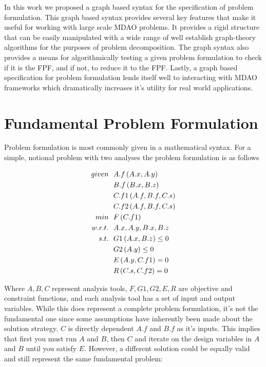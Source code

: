     In this work we proposed a graph based syntax for the specification of problem formulation. This graph based syntax provides several key
    features that make it useful for working with large scale MDAO problems. It provides a rigid structure that can be easily manipulated 
    with a wide range of well establish graph-theory algorithms for the purposes of problem decomposition. The graph syntax also 
    provides a means for algorithmically testing a given problem formulation to check if it is the FPF, and if not, to reduce it to the FPF. 
    Lastly, a graph based specification for problem formulation lends itself well to interacting with MDAO frameworks which dramatically 
    increases it's utility for real world applications. 


\section{Fundamental Problem Formulation}
    Problem formulation is most commonly given in a mathematical syntax. For a simple, notional problem with two analyses
    the problem formulation is as follows

    \begin{align}
        given & \ \ A.f\left(A.x,A.y\right) \notag
        \\ & \ \  B.f\left(B.x,B.z\right) \notag
        \\ & \ \  C.f1\left(A.f,B.f,C.s\right) \notag
        \\ & \ \  C.f2\left(A.f,B.f,C.s\right) \notag
        \\min &\ \ F\left(C.f1\right) \notag
        \\ w.r.t. &\ \  A.x,A.y,B.x,B.z \notag
        \\ s.t. &\ \ G1\left(A.x,B.z\right) \leq 0 \notag
        \\      &\ \ G2\left(A.y\right) \leq 0 \notag
        \\      &\ \ E\left(A.y,C.f1\right) = 0 \notag
        \\      &\ \ R\left(C.s,C.f2\right) = 0 
        \label{eqn:simple}
    \end{align}

    Where $A,B,C$ represent analysis tools, $F,G1,G2,E,R$ are objective and constraint functions, and each analysis tool 
    has a set of input and output variables. While this does represent a complete problem formulation, 
    it's not the fundamental one since some assumptions have inherently been made about the solution 
    strategy. $C$ is directly dependent
    $A.f$ and $B.f$ as it's inputs. This implies that first you must run $A$ and $B$, then $C$ and
    iterate on the design variables in $A$ and $B$ until you satisfy $E$. However, a different solution could be equally valid and still represent
    the same fundamental problem: 


